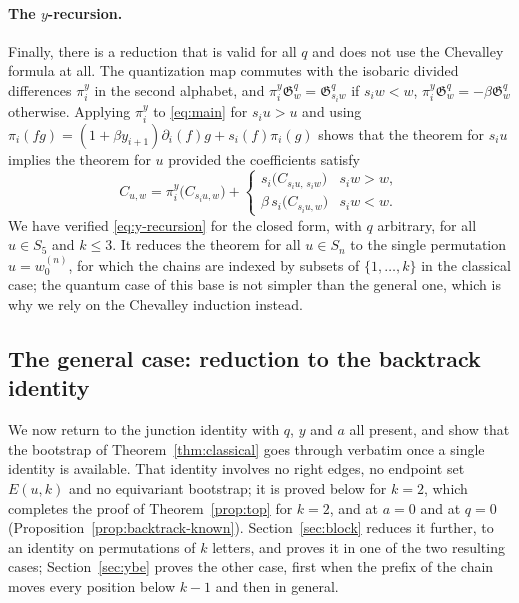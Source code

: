 \documentclass[11pt]{article}
\newcommand{\G}{\mathfrak{G}}
\begin{document}
\paragraph{The \texorpdfstring{$y$}{y}-recursion.}
Finally, there is a reduction that is valid for all $q$ and does not
use the Chevalley formula at all. The quantization map commutes with
the isobaric divided differences $\pi^y_i$ in the second alphabet,
and $\pi^y_i\G^q_w=\G^q_{s_iw}$ if $s_iw<w$, $\pi^y_i\G^q_w=-\beta\G^q_w$
otherwise. Applying $\pi^y_i$ to \eqref{eq:main} for $s_iu>u$ and
using $\pi_i(fg)=(1+\beta y_{i+1})\partial_i(f)g+s_i(f)\pi_i(g)$ shows
that the theorem for $s_iu$ implies the theorem for $u$ provided the
coefficients satisfy
\begin{equation}\label{eq:y-recursion}
 C_{u,w}=\pi^y_i\bigl(C_{s_iu,w}\bigr)
 +\begin{cases}
   s_i\bigl(C_{s_iu,\,s_iw}\bigr)& s_iw>w,\\
   \beta\,s_i\bigl(C_{s_iu,w}\bigr)& s_iw<w.
  \end{cases}
\end{equation}
We have verified \eqref{eq:y-recursion} for the closed form, with
$q$ arbitrary, for all $u\in S_5$ and $k\leq3$. It reduces the
theorem for all $u\in S_n$ to the single permutation $u=w_0^{(n)}$,
for which the chains are indexed by subsets of $\{1,\ldots,k\}$ in the
classical case; the quantum case of this base is not simpler than the
general one, which is why we rely on the Chevalley induction instead.

\subsection{The general case: reduction to the backtrack identity}
\label{sec:backtrack}

We now return to the junction identity with $q$, $y$ and $a$ all
present, and show that the bootstrap of Theorem~\ref{thm:classical}
goes through verbatim once a single identity is available. That
identity involves no right edges, no endpoint set $E(u,k)$ and no
equivariant bootstrap; it is proved below for $k=2$, which completes
the proof of Theorem~\ref{prop:top} for $k=2$, and at $a=0$ and at
$q=0$ (Proposition~\ref{prop:backtrack-known}).
Section~\ref{sec:block} reduces it further, to an identity on
permutations of $k$ letters, and proves it in one of the two
resulting cases; Section~\ref{sec:ybe} proves the other case, first
when the prefix of the chain moves every position below $k-1$ and
then in general.
\end{document}
